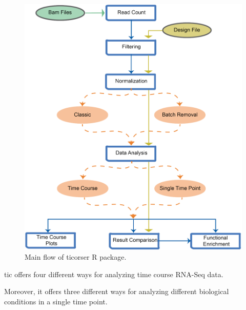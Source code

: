 \begin{figure}[H]
\includegraphics[width=\textwidth,height=\textheight,keepaspectratio]{img/ticorser/main_flow.pdf}
\caption[ticorser mainflow]{Main flow of ticorser R package.}
\label{fig:ticorserflow}
\centering
\end{figure}

\gls{tic} offers four different ways for analyzing time course RNA-Seq data.

Moreover, it offers three different ways for analyzing different biological conditions in a single time point.
